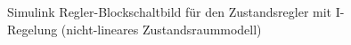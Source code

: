 \begin{figure}[H]
    \centering
    \caption[Zustandsregler mit I-Regelung Simulink (nicht-linear)]{Simulink Regler-Blockschaltbild für den Zustandsregler mit I-Regelung (nicht-lineares Zustandsraummodell)}
    \label{fig:Bild24}
\end{figure}

